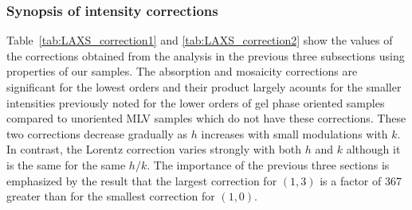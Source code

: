 \subsubsection{Synopsis of intensity corrections}
Table~\ref{tab:LAXS_correction1} and \ref{tab:LAXS_correction2} show
the values of the corrections obtained from the analysis in the previous three 
subsections using properties of our samples. The absorption and mosaicity 
corrections are significant for the lowest orders and their product largely 
acounts for the smaller intensities previously noted 
\cite{ref:Guler09} for the lower orders of gel phase oriented 
samples compared to unoriented MLV samples which do not have these corrections.  
These two corrections decrease gradually as $h$ increases with small 
modulations with $k$. In contrast, the Lorentz correction varies strongly with 
both $h$ and $k$ although it is the same for the same $h/k$. The importance of 
the previous three sections is emphasized by the result that the largest 
correction for $(1,3)$ is a factor of 367 greater than for the smallest 
correction for $(1,0)$.


